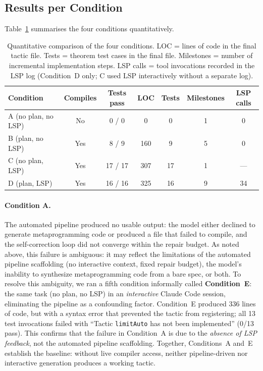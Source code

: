 \documentclass{llncs}
\begin{document}
\subsection{Results per Condition}
\label{sec:results}

Table~\ref{tab:results} summarises the four conditions quantitatively.

\begin{table}[h]
\centering
\caption{Quantitative comparison of the four conditions.
LOC = lines of code in the final tactic file.
Tests = theorem test cases in the final file.
Milestones = number of incremental implementation steps.
LSP calls = tool invocations recorded in the LSP log (Condition~D only; C used LSP interactively without a separate log).}
\label{tab:results}
\begin{tabular}{lcccccc}
\toprule
\textbf{Condition} & \textbf{Compiles} & \textbf{Tests pass} & \textbf{LOC} & \textbf{Tests} & \textbf{Milestones} & \textbf{LSP calls} \\
\midrule
A (no plan, no LSP) & No  & 0 / 0  & 0   & 0  & 1 & 0  \\
B (plan, no LSP)    & Yes & 8 / 9  & 160 & 9  & 5 & 0  \\
C (no plan, LSP)    & Yes & 17 / 17 & 307 & 17 & 1 & --- \\
D (plan, LSP)       & Yes & 16 / 16 & 325 & 16 & 9 & 34 \\
\bottomrule
\end{tabular}
\end{table}

\paragraph{Condition A.}
The automated pipeline produced no usable output: the model either declined to
generate metaprogramming code or produced a file that failed to compile, and the
self-correction loop did not converge within the repair budget.
As noted above, this failure is ambiguous: it may reflect the limitations of the
automated pipeline scaffolding (no interactive context, fixed repair budget),
the model's inability to synthesize metaprogramming code from a bare spec, or both.
To resolve this ambiguity, we ran a fifth condition informally called \textbf{Condition~E}:
the same task (no plan, no LSP) in an \emph{interactive} Claude Code session, eliminating
the pipeline as a confounding factor.
Condition~E produced 336 lines of code, but with a syntax error that prevented the tactic
from registering; all 13 test invocations failed with ``Tactic \texttt{limitAuto} has not
been implemented'' (0/13 pass).
This confirms that the failure in Condition~A is due to the \emph{absence of LSP feedback},
not the automated pipeline scaffolding.
Together, Conditions~A and~E establish the baseline: without live compiler access, neither
pipeline-driven nor interactive generation produces a working tactic.
\end{document}
